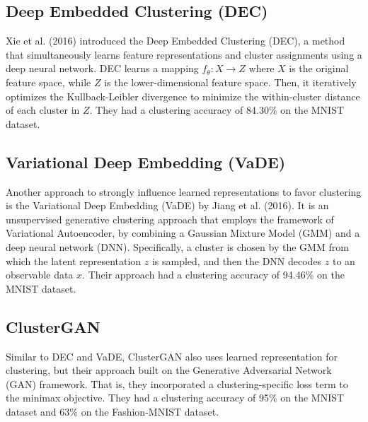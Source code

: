 \documentclass[conference]{IEEEtran}
\begin{document}
\subsection{Deep Embedded Clustering (DEC)}
Xie et al. (2016)\cite{xie2016unsupervised} introduced the Deep Embedded Clustering (DEC), a method that simultaneously learns feature representations and cluster assignments using a deep neural network. DEC learns a mapping $f_{\theta}: X \rightarrow Z$ where $X$ is the original feature space, while $Z$ is the lower-dimensional feature space. Then, it iteratively optimizes the Kullback-Leibler divergence to minimize the within-cluster distance of each cluster in $Z$. They had a clustering accuracy of 84.30\% on the MNIST dataset\cite{lecun1998gradient}.

\subsection{Variational Deep Embedding (VaDE)}
Another approach to strongly influence learned representations to favor clustering is the Variational Deep Embedding (VaDE) by Jiang et al. (2016)\cite{jiang2016variational}. It is an unsupervised generative clustering approach that employs the framework of Variational Autoencoder\cite{kingma2013autoencoding}, by combining a Gaussian Mixture Model (GMM) and a deep neural network (DNN). Specifically, a cluster is chosen by the GMM from which the latent representation $z$ is sampled, and then the DNN decodes $z$ to an observable data $x$. Their approach had a clustering accuracy of 94.46\% on the MNIST dataset\cite{lecun1998gradient}.

\subsection{ClusterGAN}
Similar to DEC\cite{xie2016unsupervised} and VaDE\cite{jiang2016variational}, ClusterGAN\cite{mukherjee2019clustergan} also uses learned representation for clustering, but their approach built on the Generative Adversarial Network (GAN)\cite{goodfellow2014generative} framework. That is, they incorporated a clustering-specific loss term to the minimax objective. They had a clustering accuracy of 95\% on the MNIST dataset\cite{lecun1998gradient} and 63\% on the Fashion-MNIST dataset\cite{xiao2017fashion}.
\end{document}
